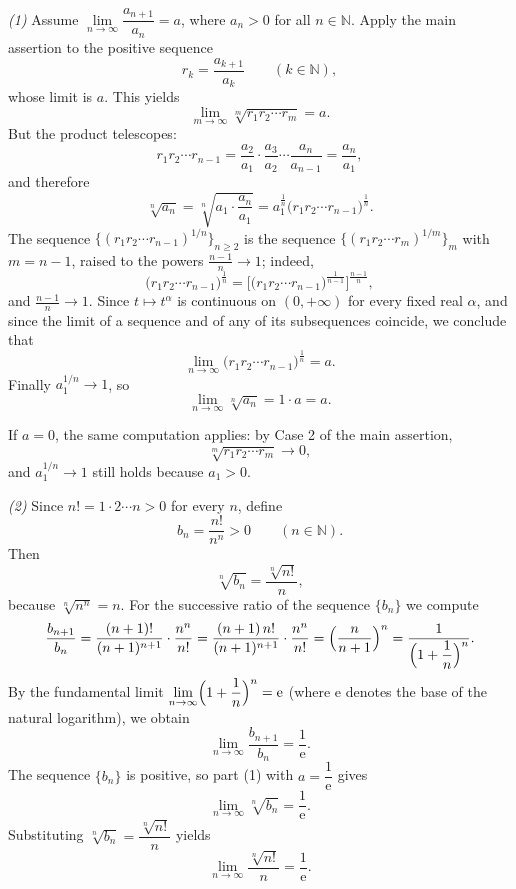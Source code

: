 \documentclass[11pt,a4paper]{article}
\newenvironment{solution}[1]{%
  \par\addvspace{1.7ex}%
  \noindent{\color{solutioncolor}\textbf{#1}}\hspace{0.55em}\ignorespaces}%
  {\par\addvspace{0.9ex}}
\begin{document}
\begin{solution}{Solution 2.1.10}
\emph{(1)} Assume $\lim\limits_{n\to\infty}\dfrac{a_{n+1}}{a_n}=a$, where $a_n>0$ for all $n\in\mathbb{N}$. Apply the main assertion to the positive sequence
\[
r_k=\frac{a_{k+1}}{a_k}\qquad(k\in\mathbb{N}),
\]
whose limit is $a$. This yields
\[
\lim_{m\to\infty}\sqrt[m]{r_1r_2\cdots r_m}=a .
\]
But the product telescopes:
\[
r_1r_2\cdots r_{n-1}
=\frac{a_2}{a_1}\cdot\frac{a_3}{a_2}\cdots\frac{a_n}{a_{n-1}}
=\frac{a_n}{a_1},
\]
and therefore
\[
\sqrt[n]{a_n}=\sqrt[n]{a_1\cdot\frac{a_n}{a_1}}
=a_1^{\frac1n}\bigl(r_1r_2\cdots r_{n-1}\bigr)^{\frac1n}.
\]
The sequence $\{(r_1r_2\cdots r_{n-1})^{1/n}\}_{n\ge 2}$ is the sequence $\{(r_1r_2\cdots r_m)^{1/m}\}_m$ with $m=n-1$, raised to the powers $\frac{n-1}{n}\to 1$; indeed,
\[
\bigl(r_1r_2\cdots r_{n-1}\bigr)^{\frac1n}
=\bigl[\bigl(r_1r_2\cdots r_{n-1}\bigr)^{\frac{1}{n-1}}\bigr]^{\frac{n-1}{n}},
\]
and $\frac{n-1}{n}\to 1$. Since $t\mapsto t^{\alpha}$ is continuous on $(0,+\infty)$ for every fixed real $\alpha$, and since the limit of a sequence and of any of its subsequences coincide, we conclude that
\[
\lim_{n\to\infty}\bigl(r_1r_2\cdots r_{n-1}\bigr)^{\frac1n}=a .
\]
Finally $a_1^{1/n}\to 1$, so
\[
\lim_{n\to\infty}\sqrt[n]{a_n}=1\cdot a=a .
\]

If $a=0$, the same computation applies: by Case 2 of the main assertion,
\[
\sqrt[m]{r_1r_2\cdots r_m}\longrightarrow 0 ,
\]
and $a_1^{1/n}\to 1$ still holds because $a_1>0$.

\emph{(2)} Since $n!=1\cdot2\cdots n>0$ for every $n$, define
\[
b_n=\frac{n!}{n^n}>0\qquad(n\in\mathbb{N}).
\]
Then
\[
\sqrt[n]{b_n}=\frac{\sqrt[n]{n!}}{n},
\]
because $\sqrt[n]{n^n}=n$. For the successive ratio of the sequence $\{b_n\}$ we compute
\[
\frac{b_{n+1}}{b_n}
=\frac{(n+1)!}{(n+1)^{n+1}}\cdot\frac{n^n}{n!}
=\frac{(n+1)\,n!}{(n+1)^{n+1}}\cdot\frac{n^n}{n!}
=\Bigl(\frac{n}{n+1}\Bigr)^{n}
=\frac{1}{\Bigl(1+\dfrac1n\Bigr)^{n}} .
\]
By the fundamental limit $\lim\limits_{n\to\infty}\Bigl(1+\dfrac1n\Bigr)^{n}=\mathrm{e}$ (where $\mathrm{e}$ denotes the base of the natural logarithm), we obtain
\[
\lim_{n\to\infty}\frac{b_{n+1}}{b_n}=\frac1{\mathrm{e}} .
\]
The sequence $\{b_n\}$ is positive, so part (1) with $a=\dfrac1{\mathrm{e}}$ gives
\[
\lim_{n\to\infty}\sqrt[n]{b_n}=\frac1{\mathrm{e}} .
\]
Substituting $\sqrt[n]{b_n}=\dfrac{\sqrt[n]{n!}}{n}$ yields
\[
\lim_{n\to\infty}\frac{\sqrt[n]{n!}}{n}=\frac1{\mathrm{e}} .
\]
\end{solution}
\end{document}
